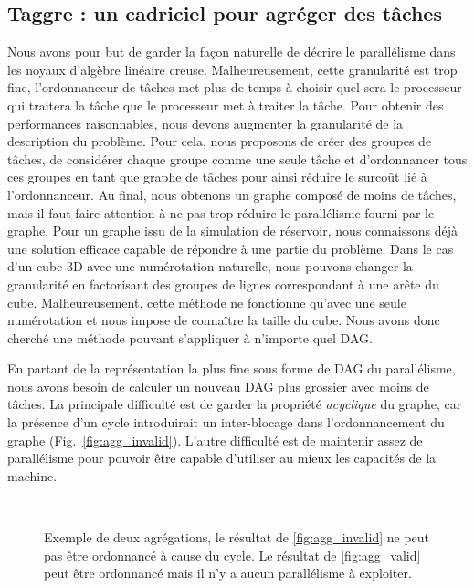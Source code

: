 \subsection{Taggre : un cadriciel pour agréger des tâches}
Nous avons pour but de garder la façon naturelle de décrire le parallélisme dans les noyaux d'algèbre linéaire creuse.
%
Malheureusement, cette granularité est trop fine, l'ordonnanceur de tâches met plus de temps à choisir quel sera le processeur qui traitera la tâche que le processeur met à traiter la tâche.
%
Pour obtenir des performances raisonnables, nous devons augmenter la granularité de la description du problème.
%
Pour cela, nous proposons de créer des groupes de tâches, de considérer chaque groupe comme une seule tâche et d'ordonnancer tous ces groupes en tant que graphe de tâches pour ainsi réduire le surcoût lié à l'ordonnanceur.
%
Au final, nous obtenons un graphe composé de moins de tâches, mais il faut faire attention à ne pas trop réduire le parallélisme fourni par le graphe.
%
Pour un graphe issu de la simulation de réservoir, nous connaissons déjà une solution efficace capable de répondre à une partie du problème.
%
Dans le cas d'un cube 3D avec une numérotation naturelle, nous pouvons changer la granularité en factorisant des groupes de lignes correspondant à une arête du cube.
%
Malheureusement, cette méthode ne fonctionne qu'avec une seule numérotation et nous impose de connaître la taille du cube.
%
Nous avons donc cherché une méthode pouvant s'appliquer à n'importe quel DAG.



En partant de la représentation la plus fine sous forme de DAG du parallélisme, nous avons besoin de calculer un nouveau DAG plus grossier avec moins de tâches.
%
La principale difficulté est de garder la propriété {\em acyclique} du graphe, car la présence d'un cycle introduirait un inter-blocage dans l'ordonnancement du graphe (Fig.~\ref{fig:agg_invalid}).
%
L'autre difficulté est de maintenir assez de parallélisme pour pouvoir être capable d'utiliser au mieux les capacités de la machine.

\begin{figure}[!h]
     \begin{center}
        ~
    \end{center}
    \caption{Exemple de deux agrégations, le résultat de \ref{fig:agg_invalid} ne peut pas être ordonnancé à cause du cycle. Le résultat de \ref{fig:agg_valid} peut être ordonnancé mais il n'y a aucun parallélisme à exploiter.}
    \label{fig:agg_basic}
\end{figure}

